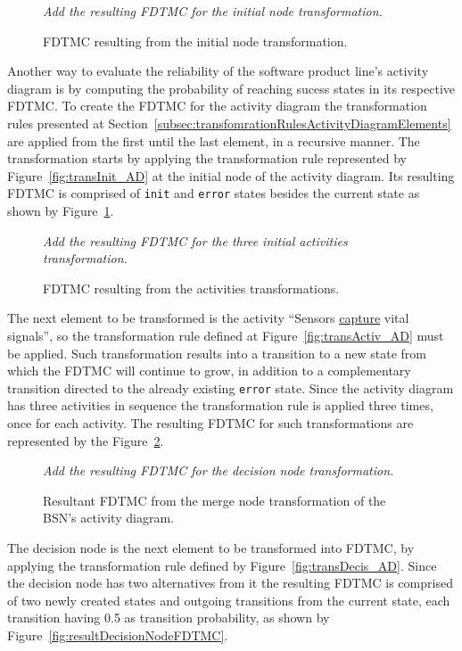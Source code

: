 \begin{figure}[h!]
\centering
\textit{Add the resulting FDTMC for the initial node transformation.}
\caption{FDTMC resulting from the initial node transformation.}
\label{fig:resultInitNodeFDTMC}
\end{figure}


Another way to evaluate the reliability of the software product line's
activity diagram is by computing the probability of reaching sucess states in
its respective FDTMC. To create the FDTMC for the activity diagram the
transformation rules presented at
Section~\ref{subsec:transfomrationRulesActivityDiagramElements} are applied from
the first until the last element, in a recursive manner. The transformation
starts by applying the transformation rule represented by
Figure~\ref{fig:transInit_AD} at the initial node of the activity diagram. Its
resulting FDTMC is comprised of \texttt{init} and \texttt{error} states besides
the current state as shown by Figure~\ref{fig:resultInitNodeFDTMC}.


\begin{figure}[h!]
\centering
\textit{Add the resulting FDTMC for the three initial activities transformation.}
\caption{FDTMC resulting from the activities transformations.} 
\label{fig:resultInitialActivitiesFDTMC}
\end{figure}


The next element to be transformed is the activity ``Sensors \underline{capture}
vital signals'', so the transformation rule defined at
Figure~\ref{fig:transActiv_AD} must be applied. Such transformation results into
a transition to a new state from which the FDTMC will continue to grow, in
addition to a complementary transition directed to the already existing
\texttt{error} state. Since the activity diagram has three activities in
sequence the transformation rule is applied three times, once for each activity.
The resulting FDTMC for such transformations are represented by the
Figure~\ref{fig:resultInitialActivitiesFDTMC}. 


\begin{figure}[h!]
\centering
\textit{Add the resulting FDTMC for the decision node transformation.}
\caption{Resultant FDTMC from the merge node transformation of the BSN's
activity diagram.} 
\label{fig:resultMergeNodeFDTMC}
\end{figure}


The decision node is the next element to be transformed into FDTMC, by applying
the transformation rule defined by Figure~\ref{fig:transDecis_AD}. Since the
decision node has two alternatives from it the resulting FDTMC is comprised of
two newly created states and outgoing transitions from the current state, each
transition having 0.5 as transition probability, as shown by
Figure~\ref{fig:resultDecisionNodeFDTMC}. 


